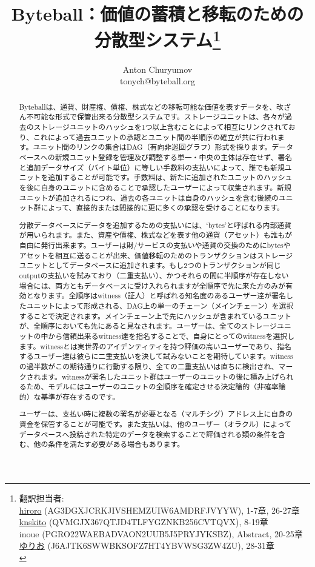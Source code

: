 \documentclass[a4paper, dvipdfmx]{jsarticle}
\title{Byteball：価値の蓄積と移転のための分散型システム\thanks{翻訳担当者: \\
     \href{https://twitter.com/hirorobyte}{hiroro} (AG3DGXJCRKJIVSHEMZUIW6AMDRFJVYYW), 1-7章, 26-27章 \\
     \href{http://knskito.com/}{knskito} (QVMGJX367QTJD4TLFYGZNKB256CVTQVX), 8-19章 \\
     inoue (PGRO22WAEBADVAON2UUB5J5PRYJYKSBZ), Abstract, 20-25章 \\
     \href{https://twitter.com/yurwo}{ゆりお} (J6AJTK6SWWBKSOFZ7HT4YBVWSG3ZW4ZU), 28-31章 \\
     }
}
\author{Anton Churyumov\\tonych@byteball.org}
\date{}
\begin{document}
\maketitle

\begin{abstract}
Byteballは、通貨、財産権、債権、株式などの移転可能な価値を表すデータを、改ざん不可能な形式で保管出来る分散型システムです。ストレージユニットは、各々が過去のストレージユニットのハッシュを1つ以上含むことによって相互にリンクされており、これによって過去ユニットの承認とユニット間の半順序の確立が共に行われます。ユニット間のリンクの集合はDAG（有向非巡回グラフ）形式を採ります。データベースへの新規ユニット登録を管理及び調整する単一・中央の主体は存在せず、署名と追加データサイズ（バイト単位）に等しい手数料の支払いによって、誰でも新規ユニットを追加することが可能です。手数料は、新たに追加されたユニットのハッシュを後に自身のユニットに含めることで承認したユーザーによって収集されます。新規ユニットが追加されるにつれ、過去の各ユニットは自身のハッシュを含む後続のユニット群によって、直接的または間接的に更に多くの承認を受けることになります。

分散データベースにデータを追加するための支払いには、‘bytes’と呼ばれる内部通貨が用いられます。また、資産や債権、株式などを表す他の通貨（アセット）も誰もが自由に発行出来ます。ユーザーは財/サービスの支払いや通貨の交換のためにbytesやアセットを相互に送ることが出来、価値移転のためのトランザクションはストレージユニットとしてデータベースに追加されます。もし2つのトランザクションが同じoutputの支払いを試みており（二重支払い）、かつそれらの間に半順序が存在しない場合には、両方ともデータベースに受け入れられますが全順序で先に来た方のみが有効となります。全順序はwitness（証人）と呼ばれる知名度のあるユーザー達が署名したユニットによって形成される、DAG上の単一のチェーン（メインチェーン）を選択することで決定されます。メインチェーン上で先にハッシュが含まれているユニットが、全順序においても先にあると見なされます。ユーザーは、全てのストレージユニットの中から信頼出来るwitness達を指名することで、自身にとってのwitnessを選択します。witnessとは実世界のアイデンティティを持つ評価の高いユーザーであり、指名するユーザー達は彼らに二重支払いを決して試みないことを期待しています。witnessの過半数がこの期待通りに行動する限り、全ての二重支払いは直ちに検出され、マークされます。witnessが署名したユニット群はユーザーのユニットの後に積み上げられるため、モデルにはユーザーのユニットの全順序を確定させる決定論的（非確率論的）な基準が存在するのです。

ユーザーは、支払い時に複数の署名が必要となる（マルチシグ）アドレス上に自身の資金を保管することが可能です。また支払いは、他のユーザー（オラクル）によってデータベースへ投稿された特定のデータを検索することで評価される類の条件を含む、他の条件を満たす必要がある場合もあります。


\end{abstract}
\end{document}
